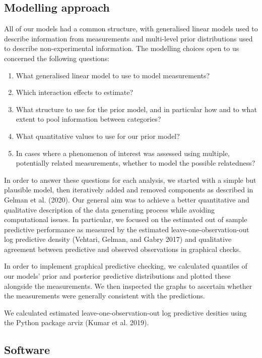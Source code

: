 \documentclass[
  letterpaper,
  DIV=11,
  numbers=noendperiod,
  oneside]{scrartcl}
\theoremstyle{plain}
\theoremstyle{remark}
\begin{document}
\subsection{Modelling approach}\label{modelling-approach}

All of our models had a common structure, with generalised linear models
used to describe information from measurements and multi-level prior
distributions used to describe non-experimental information. The
modelling choices open to us concerned the following questions:

\begin{enumerate}
\def\labelenumi{\arabic{enumi}.}
\item
  What generalised linear model to use to model measurements?
\item
  Which interaction effects to estimate?
\item
  What structure to use for the prior model, and in particular how and
  to what extent to pool information between categories?
\item
  What quantitative values to use for our prior model?
\item
  In cases where a phenomenon of interest was assessed using multiple,
  potentially related measurements, whether to model the possible
  relatedness?
\end{enumerate}

In order to answer these questions for each analysis, we started with a
simple but plausible model, then iteratively added and removed
components as described in Gelman et al. (2020). Our general aim was to
achieve a better quantitative and qualitative description of the data
generating process while avoiding computational issues. In particular,
we focused on the estimated out of sample predictive performance as
measured by the estimated leave-one-observation-out log predictive
density (Vehtari, Gelman, and Gabry 2017) and qualitative agreement
between predictive and observed observations in graphical checks.

In order to implement graphical predictive checking, we calculated
quantiles of our models' prior and posterior predictive distributions
and plotted these alongside the measurements. We then inspected the
graphs to ascertain whether the measurements were generally consistent
with the predictions.

We calculated estimated leave-one-observation-out log predictive
desities using the Python package arviz (Kumar et al. 2019).

\subsection{Software}\label{software}
\end{document}
